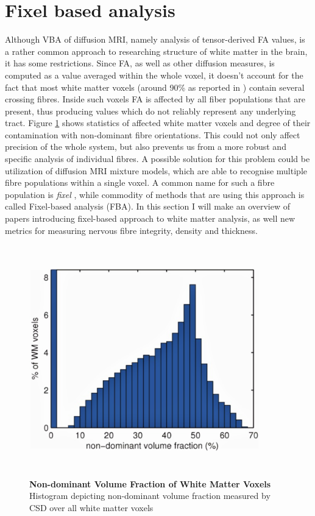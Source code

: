 \documentclass[thesis.tex]{subfiles}
\begin{document}
\section{Fixel based analysis}
Although VBA of diffusion MRI, namely analysis of tensor-derived FA values, is a rather common approach to researching structure of white matter in the brain, it has some restrictions. Since FA, as well as other diffusion measures, is computed as a value averaged within the whole voxel, it doesn't account for the fact that most white matter voxels (around 90\% as reported in \cite{crossingFibers2013}) contain several crossing fibres. Inside such voxels FA is affected by all fiber populations that are present, thus producing values which do not reliably represent any underlying tract. Figure \ref{fig:percent-of-non-dominant-volume-fraction} shows statistics of affected white matter voxels and degree of their contamination with non-dominant fibre orientations.
This could not only affect precision of the whole system, but also prevents us from a more robust and specific analysis of individual fibres.
A possible solution for this problem could be utilization of diffusion MRI mixture models, which are able to recognise multiple fibre populations within a single voxel. A common name for such a fibre population is \textit{fixel} \cite{aboutFixels2015Raffelt}, while commodity of methods that are using this approach is called Fixel-based analysis (FBA). In this section I will make an overview of papers introducing fixel-based approach to white matter analysis, as well new metrics for measuring nervous fibre integrity, density and thickness.

\begin{figure}
\centering
\includegraphics[width=10cm,height=10cm,keepaspectratio]{thesis_radomskyi/images/percent-of-non-dominant-volume-fraction-cite-crossingFibers2013.png}
\caption{\textbf{Non-dominant Volume Fraction of White Matter Voxels} Histogram depicting non-dominant volume fraction measured by CSD over all white matter voxels \cite{crossingFibers2013}}
\label{fig:percent-of-non-dominant-volume-fraction}
\end{figure}
\end{document}

